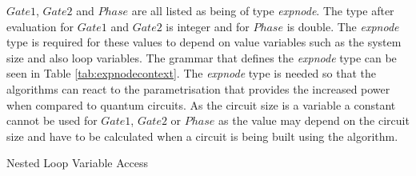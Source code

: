 $Gate1$, $Gate2$ and $Phase$ are all listed as being of type \emph{expnode}.
The type after evaluation for $Gate1$ and $Gate2$ is integer and for $Phase$ is double.
The \emph{expnode} type is required for these values to depend on value variables such as the system size and also loop variables.
The grammar that defines the \emph{expnode} type can be seen in Table \ref{tab:expnodecontext}.
The \emph{expnode} type is needed so that the algorithms can react to the parametrisation that provides the increased power when compared to quantum circuits.
As the circuit size is a variable a constant cannot be used for $Gate1$, $Gate2$ or $Phase$ as the value may depend on the circuit size and have to be calculated when a circuit is being built using the algorithm.

\begin{algorithm}
\begin{algorithmic}
\STATE {}
\STATE {}
\ENDFOR
\ENDFOR
\end{algorithmic}
\caption{Nested Loop Variable Access}
\label{alg:nestloopvars}
\end{algorithm}


